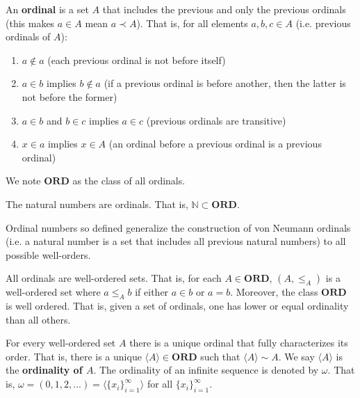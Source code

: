 \documentclass{article}
\newcommand{\marginleft}[1] {\reversemarginpar\marginpar{#1}}
\def\ordinals{\textbf{ORD}}
\def\ordless{\prec}
\def\ordeq{\sim}
\begin{document}
\begin{defn}[Ordinals]
	An \textbf{ordinal} \marginleft{Ordinals: \ordinals} is a set $A$ that includes the previous and only the previous ordinals (this makes $a \in A$ mean $a \ordless A$). That is, for all elements $a, b, c \in A$ (i.e. previous ordinals of $A$):
	\begin{enumerate}
		\item $a \notin a$ (each previous ordinal is not before itself)
		\item $a \in b$ implies $b \notin a$ (if a previous ordinal is before another, then the latter is not before the former)
		\item $a \in b$ and $b \in c$ implies $a \in c$ (previous ordinals are transitive)
		\item $x \in a$ implies $x \in A$ (an ordinal before a previous ordinal is a previous ordinal)
	\end{enumerate}
	We note $\ordinals$ as the class of all ordinals.
\end{defn}

\begin{prop}
	The natural numbers are ordinals. That is, $\mathbb{N} \subset \ordinals$.
\end{prop}

\begin{remark}
	Ordinal numbers so defined generalize the construction of von Neumann ordinals (i.e. a natural number is a set that includes all previous natural numbers) to all possible well-orders.
\end{remark}

\begin{prop}
	All ordinals are well-ordered sets. That is, for each $A \in \ordinals$, $(A, \leq_A)$ is a well-ordered set where $a \leq_A b$ if either $a \in b$ or $a = b$. Moreover, the class $\ordinals$ is well ordered. That is, given a set of ordinals, one has lower or equal ordinality than all others.
\end{prop}

\begin{prop}
	For every \marginleft{$\langle A \rangle$, $\omega$} well-ordered set $A$ there is a unique ordinal that fully characterizes its order. That is, there is a unique $\langle A \rangle \in \ordinals$ such that $\langle A \rangle \ordeq A$. We say $\langle A \rangle$ is the \textbf{ordinality of $A$}. The ordinality of an infinite sequence is denoted by $\omega$. That is, $\omega = (0, 1, 2, ...) = \langle \{x_i\}_{i=1}^\infty \rangle$ for all $\{x_i\}_{i=1}^\infty$.
\end{prop}
\end{document}
